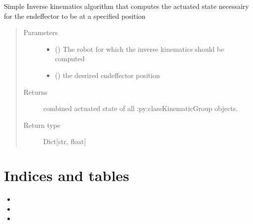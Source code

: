 \documentclass[letterpaper,10pt,english]{sphinxmanual}
\begin{document}
\begin{fulllineitems}
\label{\detokenize{code_docu:trip_kinematics.Robot.inverse_kinematics}}
Simple Inverse kinematics algorithm that computes the actuated state necessairy for the endeffector to be at a specified position
\begin{quote}\begin{description}
\item[{Parameters}] \leavevmode\begin{itemize}
\item {} 
 ({\hyperref[\detokenize{code_docu:trip_kinematics.Robot.Robot}]{}}) \textendash{} The robot for which the inverse kinematics should be computed

\item {} 
 (\sphinxstyleliteralemphasis{\sphinxupquote{{[}}}\sphinxstyleliteralemphasis{\sphinxupquote{{]}}}) \textendash{} the desrired endeffector position

\end{itemize}

\item[{Returns}] \leavevmode
combined actuated state of all :py:class\textasciigrave{}KinematicGroup\textasciigrave{} objects.

\item[{Return type}] \leavevmode
Dict{[}str, float{]}

\end{description}\end{quote}

\end{fulllineitems}



\chapter{Indices and tables}
\label{\detokenize{index:indices-and-tables}}\begin{itemize}
\item {} 

\item {} 

\item {} 

\end{itemize}
\end{document}
